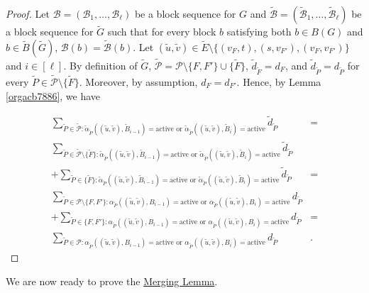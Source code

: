 \documentclass[fontsize=11pt,paper=a4]{book}
\begin{document}
\begin{proof}
Let \(\mathcal{B}=(\mathscr{B}_1,\dots,\mathscr{B}_{\ell})\) be a block sequence for \(G\) and \(\tilde{\mathcal{B}}=(\tilde{\mathscr{B}}_1,\dots,\tilde{\mathscr{B}}_{\ell})\) be a block sequence for \(\tilde{G}\) such that for every block \(b\) satisfying both \(b\in B(G)\) and \(b\in\tilde{B}(\tilde{G})\), \(\mathcal{B}(b)=\tilde{\mathcal{B}}(b)\).
Let \((\tilde{u},\tilde{v})\in\tilde{E}\setminus\{(v_F,t),(s,v_{F'}),(v_F,v_{F'})\}\) and \(i\in[\ell]\).
By definition of \(\tilde{G}\), \(\tilde{\mathcal{P}}=\mathcal{P}\setminus\{F,F'\}\cup\{\tilde{F}\}\), \(\tilde{d}_{\tilde{F}}=d_F\), and \(\tilde{d}_{\tilde{P}}=d_{\tilde{P}}\) for every \(\tilde{P}\in\tilde{\mathcal{P}}\setminus\{\tilde{F}\}\).
Moreover, by assumption, \(d_F=d_{F'}\).
Hence, by Lemma \ref{orgacb7886}, we have

\begin{align*}
\sum_{\tilde{P}\in\tilde{\mathcal{P}}:\tilde{\alpha}_{\tilde{P}}((\tilde{u},\tilde{v}),\tilde{B}_{i-1})=\mathrm{active}\text{ or }\tilde{\alpha}_{\tilde{P}}((\tilde{u},\tilde{v}),\tilde{B}_i)=\mathrm{active}}\tilde{d}_{\tilde{P}}&=\\
\sum_{\tilde{P}\in\tilde{\mathcal{P}}\setminus\{\tilde{F}\}:\tilde{\alpha}_{\tilde{P}}((\tilde{u},\tilde{v}),\tilde{B}_{i-1})=\mathrm{active}\text{ or }\tilde{\alpha}_{\tilde{P}}((\tilde{u},\tilde{v}),\tilde{B}_i)=\mathrm{active}}\tilde{d}_{\tilde{P}}&\\
+\sum_{\tilde{P}\in\{\tilde{F}\}:\tilde{\alpha}_{\tilde{P}}((\tilde{u},\tilde{v}),\tilde{B}_{i-1})=\mathrm{active}\text{ or }\tilde{\alpha}_{\tilde{P}}((\tilde{u},\tilde{v}),\tilde{B}_i)=\mathrm{active}}\tilde{d}_{\tilde{P}}&=\\
\sum_{\tilde{P}\in\mathcal{P}\setminus\{F,F'\}:\alpha_{\tilde{P}}((\tilde{u},\tilde{v}),B_{i-1})=\mathrm{active}\text{ or }\alpha_{\tilde{P}}((\tilde{u},\tilde{v}),B_i)=\mathrm{active}}d_{\tilde{P}}&\\
+\sum_{\tilde{P}\in\{F,F'\}:\alpha_{\tilde{P}}((\tilde{u},\tilde{v}),B_{i-1})=\mathrm{active}\text{ or }\alpha_{\tilde{P}}((\tilde{u},\tilde{v}),B_i)=\mathrm{active}}d_{\tilde{P}}&=\\
\sum_{\tilde{P}\in\mathcal{P}:\alpha_{\tilde{P}}((\tilde{u},\tilde{v}),B_{i-1})=\mathrm{active}\text{ or }\alpha_{\tilde{P}}((\tilde{u},\tilde{v}),B_i)=\mathrm{active}}d_{\tilde{P}}&.
\end{align*}
\end{proof}

We are now ready to prove the \hyperref[org7dbdd46]{Merging Lemma}.
\end{document}
